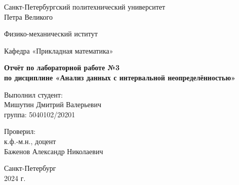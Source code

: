 \begin{titlepage}
  \begin{center}
    {\large Санкт-Петербургский политехнический университет\\Петра Великого\\}
  \end{center}

  \begin{center}
    {\large Физико-механический иститут}
  \end{center}


  \begin{center}
    {\large Кафедра «Прикладная математика»}
  \end{center}

  \vspace{8em}

  \begin{center}
    {\bfseries Отчёт по лабораторной работе №3 \\по дисциплине «Анализ данных с интервальной неопределённостью»}
  \end{center}

  \vspace{5em}

  \begin{flushleft}
    \hspace{16em}Выполнил студент:\\\hspace{16em}Мишутин Дмитрий Валерьевич\\\hspace{16em}группа: 5040102/20201

    \vspace{2em}

    \hspace{16em}Проверил:\\\hspace{16em}к.ф.-м.н., доцент\\\hspace{16em}Баженов Александр Николаевич

  \end{flushleft}


  \vspace{6em}


  \begin{center}
    Санкт-Петербург\\2024 г.
  \end{center}

\end{titlepage}
